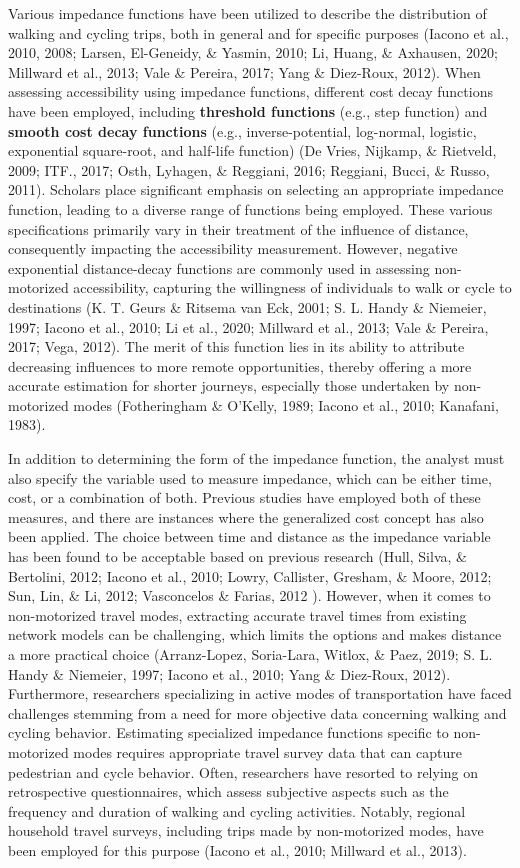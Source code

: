 \documentclass[
11pt, %
oneside, %
english, %
singlespacing, %
]{macthesis} %
\begin{document}
Various impedance functions have been utilized to describe the distribution of walking and cycling trips, both in general and for specific purposes (Iacono et al., 2010, 2008; Larsen, El-Geneidy, \& Yasmin, 2010; Li, Huang, \& Axhausen, 2020; Millward et al., 2013; Vale \& Pereira, 2017; Yang \& Diez-Roux, 2012). When assessing accessibility using impedance functions, different cost decay functions have been employed, including \textbf{threshold functions} (e.g., step function) and \textbf{smooth cost decay functions} (e.g., inverse-potential, log-normal, logistic, exponential square-root, and half-life function) (De Vries, Nijkamp, \& Rietveld, 2009; ITF., 2017; Osth, Lyhagen, \& Reggiani, 2016; Reggiani, Bucci, \& Russo, 2011). Scholars place significant emphasis on selecting an appropriate impedance function, leading to a diverse range of functions being employed. These various specifications primarily vary in their treatment of the influence of distance, consequently impacting the accessibility measurement. However, negative exponential distance-decay functions are commonly used in assessing non-motorized accessibility, capturing the willingness of individuals to walk or cycle to destinations (K. T. Geurs \& Ritsema van Eck, 2001; S. L. Handy \& Niemeier, 1997; Iacono et al., 2010; Li et al., 2020; Millward et al., 2013; Vale \& Pereira, 2017; Vega, 2012). The merit of this function lies in its ability to attribute decreasing influences to more remote opportunities, thereby offering a more accurate estimation for shorter journeys, especially those undertaken by non-motorized modes (Fotheringham \& O'Kelly, 1989; Iacono et al., 2010; Kanafani, 1983).

In addition to determining the form of the impedance function, the analyst must also specify the variable used to measure impedance, which can be either time, cost, or a combination of both. Previous studies have employed both of these measures, and there are instances where the generalized cost concept has also been applied. The choice between time and distance as the impedance variable has been found to be acceptable based on previous research (Hull, Silva, \& Bertolini, 2012; Iacono et al., 2010; Lowry, Callister, Gresham, \& Moore, 2012; Sun, Lin, \& Li, 2012; Vasconcelos \& Farias, 2012 ). However, when it comes to non-motorized travel modes, extracting accurate travel times from existing network models can be challenging, which limits the options and makes distance a more practical choice (Arranz-Lopez, Soria-Lara, Witlox, \& Paez, 2019; S. L. Handy \& Niemeier, 1997; Iacono et al., 2010; Yang \& Diez-Roux, 2012). Furthermore, researchers specializing in active modes of transportation have faced challenges stemming from a need for more objective data concerning walking and cycling behavior. Estimating specialized impedance functions specific to non-motorized modes requires appropriate travel survey data that can capture pedestrian and cycle behavior. Often, researchers have resorted to relying on retrospective questionnaires, which assess subjective aspects such as the frequency and duration of walking and cycling activities. Notably, regional household travel surveys, including trips made by non-motorized modes, have been employed for this purpose (Iacono et al., 2010; Millward et al., 2013).
\end{document}
